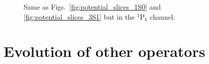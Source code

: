 \documentclass[preprintnumbers,floatfix,aps,prc,preprint,nofootinbib]{revtex4-1}
\begin{document}
%
\begin{figure}[H]
	\centering
	
	\caption{Same as Figs.~\ref{fig:potential_slices_1S0} and \ref{fig:potential_slices_3S1} but in the $^1$P$_1$ channel.}
	\label{fig:potential_slices_1P1}
\end{figure}


\section{Evolution of other operators}
\label{sec:evolution_other_operators}
\end{document}
